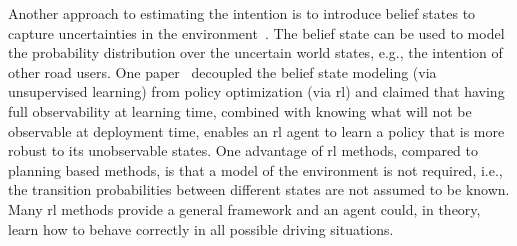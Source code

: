 Another approach to estimating the intention is to introduce belief states to capture uncertainties in the environment~\cite{Bouton2017}. The belief state can be used to model the probability distribution over the uncertain world states, e.g., the intention of other road users. One paper~\cite{wang2023} decoupled the belief state modeling (via unsupervised learning) from policy optimization (via \gls{rl}) and claimed that having full observability at learning time, combined with knowing what will not be observable at deployment time, enables an \gls{rl} agent to learn a policy that is more robust to its unobservable states. 
One advantage of \gls{rl} methods, compared to planning based methods, is that a model of the environment is not required, i.e., the transition probabilities between different states are not assumed to be known. Many \gls{rl} methods provide a general framework and an agent could, in theory, learn how to behave correctly in all possible driving situations.



